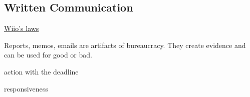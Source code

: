 \subsection{Written Communication}

\href{https://en.wikipedia.org/wiki/Wiio\%27s_laws}{Wiio's laws}

Reports, memos, emails are artifacts of bureaucracy. They create evidence and can be used for good or bad.

action with the deadline

responsiveness

